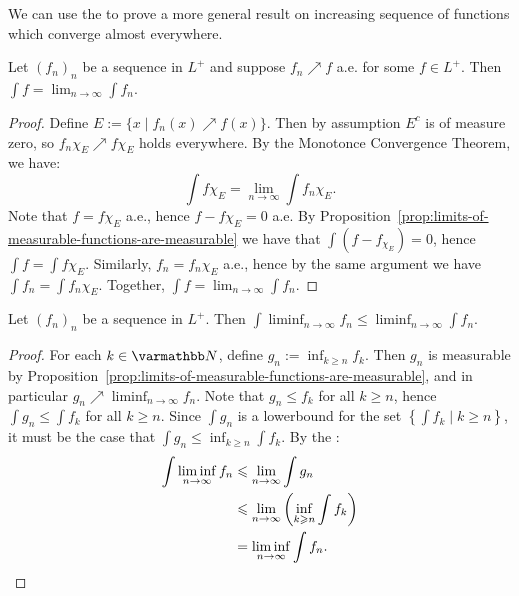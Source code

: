 We can use the  to prove a more general result on increasing sequence of functions which converge almost everywhere.

\begin{theorem}
    Let $(f_n)_n$ be a sequence in $L^+$ and suppose $f_n \nearrow f$ a.e. for some $f \in L^+$. Then $\int f = \lim_{n \rightarrow \infty} \int f_n$.
\end{theorem}
    \begin{proof}
        Define $E:= \{x \mid f_n(x) \nearrow f(x)\}$. Then by assumption $E^c$ is of measure zero, so $f_n \chi_E \nearrow f \chi_E$ holds everywhere. By the Monotonce Convergence Theorem, we have: $$\int f \chi_E = \lim_{n \rightarrow \infty} \int f_n \chi_E.$$ Note that $f = f \chi_E$ a.e., hence $f - f \chi_E = 0$ a.e. By Proposition~\ref{prop:limits-of-measurable-functions-are-measurable} we have that $\int (f - f_{\chi_E}) = 0$, hence $\int f = \int f \chi_E$. Similarly, $f_n = f_n \chi_E$ a.e., hence by the same argument we have $\int f_n = \int f_n \chi_E$. Together,  $\int f = \lim_{n \rightarrow \infty} \int f_n$. 
    \end{proof}

\begin{theorem}\label{thm:fatous}
    Let $(f_n)_n$ be a sequence in $L^+$. Then $\int \liminf_{n \rightarrow \infty} f_n \leq \liminf_{n \rightarrow \infty} \int f_n$.
\end{theorem}
    \begin{proof}
        For each $k \in \bfN$, define $g_n := \inf_{k \geq n}f_k $. Then $g_n$ is measurable by Proposition~\ref{prop:limits-of-measurable-functions-are-measurable}, and in particular $g_n \nearrow \liminf_{n \rightarrow \infty} f_n$. Note that $g_n \leq f_k$ for all $k \geq n$, hence $\int g_n \leq \int f_k$ for all $k \geq n$. Since $\int g_n$ is a lowerbound for the set $\left\{\int f_k \mid k \geq n\right\}$, it must be the case that $\int g_n \leq \inf_{k \geq n} \int f_k$. By the :
            \begin{equation*}
            \begin{split}
                \int \liminf_{n \rightarrow \infty}f_n 
                & \leq \lim_{n \rightarrow \infty}\int g_n \\
                & \leq \lim_{n \rightarrow \infty} \left( \inf_{k \geq n}\int f_k \right) \\
                & = \liminf_{n \rightarrow \infty} \int f_n. \qedhere
            \end{split}
            \end{equation*}
    \end{proof}

